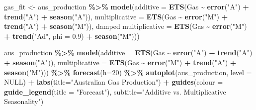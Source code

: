 \documentclass[
]{article}
\newenvironment{Shaded}{\begin{snugshade}}{\end{snugshade}}
\newcommand{\AttributeTok}[1]{\textcolor[rgb]{0.13,0.29,0.53}{#1}}
\newcommand{\ConstantTok}[1]{\textcolor[rgb]{0.56,0.35,0.01}{#1}}
\newcommand{\DecValTok}[1]{\textcolor[rgb]{0.00,0.00,0.81}{#1}}
\newcommand{\FloatTok}[1]{\textcolor[rgb]{0.00,0.00,0.81}{#1}}
\newcommand{\FunctionTok}[1]{\textcolor[rgb]{0.13,0.29,0.53}{\textbf{#1}}}
\newcommand{\NormalTok}[1]{#1}
\newcommand{\OtherTok}[1]{\textcolor[rgb]{0.56,0.35,0.01}{#1}}
\newcommand{\SpecialCharTok}[1]{\textcolor[rgb]{0.81,0.36,0.00}{\textbf{#1}}}
\newcommand{\StringTok}[1]{\textcolor[rgb]{0.31,0.60,0.02}{#1}}
\begin{document}
\begin{Shaded}
\begin{Highlighting}[]
\NormalTok{gas\_fit }\OtherTok{\textless{}{-}}\NormalTok{ aus\_production }\SpecialCharTok{\%\textgreater{}\%}
  \FunctionTok{model}\NormalTok{(}\AttributeTok{additive =} \FunctionTok{ETS}\NormalTok{(Gas }\SpecialCharTok{\textasciitilde{}} \FunctionTok{error}\NormalTok{(}\StringTok{"A"}\NormalTok{) }\SpecialCharTok{+} \FunctionTok{trend}\NormalTok{(}\StringTok{"A"}\NormalTok{) }\SpecialCharTok{+} \FunctionTok{season}\NormalTok{(}\StringTok{"A"}\NormalTok{)),}
        \AttributeTok{multiplicative =} \FunctionTok{ETS}\NormalTok{(Gas }\SpecialCharTok{\textasciitilde{}} \FunctionTok{error}\NormalTok{(}\StringTok{"M"}\NormalTok{) }\SpecialCharTok{+} \FunctionTok{trend}\NormalTok{(}\StringTok{"A"}\NormalTok{) }\SpecialCharTok{+} \FunctionTok{season}\NormalTok{(}\StringTok{"M"}\NormalTok{)),}
        \StringTok{\textasciigrave{}}\AttributeTok{damped multiplicative}\StringTok{\textasciigrave{}} \OtherTok{=} \FunctionTok{ETS}\NormalTok{(Gas }\SpecialCharTok{\textasciitilde{}} \FunctionTok{error}\NormalTok{(}\StringTok{"M"}\NormalTok{) }\SpecialCharTok{+} \FunctionTok{trend}\NormalTok{(}\StringTok{"Ad"}\NormalTok{, }\AttributeTok{phi =} \FloatTok{0.9}\NormalTok{) }\SpecialCharTok{+} \FunctionTok{season}\NormalTok{(}\StringTok{"M"}\NormalTok{))) }

\NormalTok{aus\_production }\SpecialCharTok{\%\textgreater{}\%}
  \FunctionTok{model}\NormalTok{(}\AttributeTok{additive =} \FunctionTok{ETS}\NormalTok{(Gas }\SpecialCharTok{\textasciitilde{}} \FunctionTok{error}\NormalTok{(}\StringTok{"A"}\NormalTok{) }\SpecialCharTok{+} \FunctionTok{trend}\NormalTok{(}\StringTok{"A"}\NormalTok{) }\SpecialCharTok{+} \FunctionTok{season}\NormalTok{(}\StringTok{"A"}\NormalTok{)),}
        \AttributeTok{multiplicative =} \FunctionTok{ETS}\NormalTok{(Gas }\SpecialCharTok{\textasciitilde{}} \FunctionTok{error}\NormalTok{(}\StringTok{"M"}\NormalTok{) }\SpecialCharTok{+} \FunctionTok{trend}\NormalTok{(}\StringTok{"A"}\NormalTok{) }\SpecialCharTok{+} \FunctionTok{season}\NormalTok{(}\StringTok{"M"}\NormalTok{))) }\SpecialCharTok{\%\textgreater{}\%}
  \FunctionTok{forecast}\NormalTok{(}\AttributeTok{h=}\DecValTok{20}\NormalTok{) }\SpecialCharTok{\%\textgreater{}\%}
  \FunctionTok{autoplot}\NormalTok{(aus\_production, }\AttributeTok{level =} \ConstantTok{NULL}\NormalTok{) }\SpecialCharTok{+}
  \FunctionTok{labs}\NormalTok{(}\AttributeTok{title=}\StringTok{"Australian Gas Production"}\NormalTok{) }\SpecialCharTok{+}
  \FunctionTok{guides}\NormalTok{(}\AttributeTok{colour =} \FunctionTok{guide\_legend}\NormalTok{(}\AttributeTok{title =} \StringTok{"Forecast"}\NormalTok{),}
         \AttributeTok{subtitle=}\StringTok{"Additive vs. Multiplicative Seasonality"}\NormalTok{)}
\end{Highlighting}
\end{Shaded}
\end{document}
